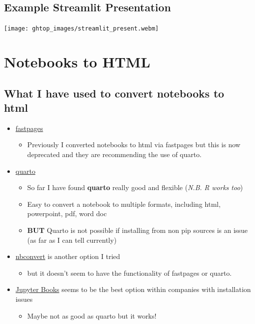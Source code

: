 \documentclass[
  letterpaper,
  DIV=11,
  numbers=noendperiod]{scrartcl}
\providecommand{\tightlist}{%
  \setlength{\itemsep}{0pt}\setlength{\parskip}{0pt}}\usepackage{longtable,booktabs,array}
\begin{document}
\hypertarget{example-streamlit-presentation}{%
\subsection{Example Streamlit
Presentation}\label{example-streamlit-presentation}}

\texttt{[image: ghtop\_images/streamlit\_present.webm]}

\hypertarget{notebooks-to-html}{%
\section{Notebooks to HTML}\label{notebooks-to-html}}

\hypertarget{what-i-have-used-to-convert-notebooks-to-html}{%
\subsection{What I have used to convert notebooks to
html}\label{what-i-have-used-to-convert-notebooks-to-html}}

\begin{itemize}
\tightlist
\item
  \href{https://fastpages.fast.ai/}{fastpages}

  \begin{itemize}
  \tightlist
  \item
    Previously I converted notebooks to html via fastpages but this is
    now deprecated and they are recommending the use of quarto.
  \end{itemize}
\item
  \href{https://quarto.org/}{quarto}

  \begin{itemize}
  \tightlist
  \item
    So far I have found \textbf{quarto} really good and flexible
    (\emph{N.B. R works too})
  \item
    Easy to convert a notebook to multiple formats, including html,
    powerpoint, pdf, word doc
  \item
    \textbf{BUT} Quarto is not possible if installing from non pip
    sources is an issue (as far as I can tell currently)
  \end{itemize}
\item
  \href{https://nbconvert.readthedocs.io/en/latest/}{nbconvert} is
  another option I tried

  \begin{itemize}
  \tightlist
  \item
    but it doesn't seem to have the functionality of fastpages or
    quarto.
  \end{itemize}
\item
  \href{https://jupyterbook.org/en/stable/intro.html}{Jupyter Books}
  seems to be the best option within companies with installation issues

  \begin{itemize}
  \tightlist
  \item
    Maybe not as good as quarto but it works!
  \end{itemize}
\end{itemize}
\end{document}

